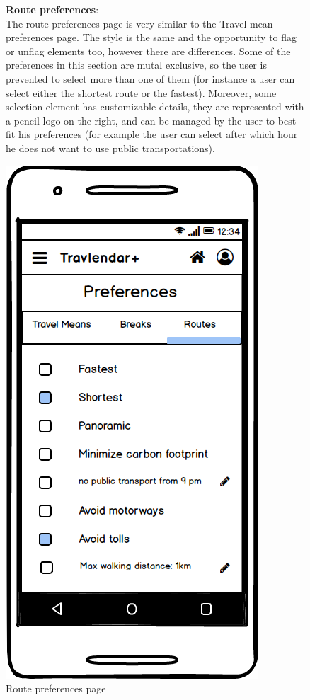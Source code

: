 		\begin{figure}
				\begin{flushleft}
				\textbf{Route preferences}:\\
				The route preferences page is very similar to the Travel mean preferences page. The style is the same and the opportunity to flag or unflag elements too, however there are differences. Some of the preferences in this section are mutal exclusive, so the user is prevented to select more than one of them (for instance a user can select either the shortest route or the fastest). Moreover, some selection element has customizable details, they are represented with a pencil logo on the right, and can be managed by the user to best fit his preferences (for example the user can select after which hour he does not want to use public transportations).
			\end{flushleft}
		\centering
		\includegraphics[width=0.6\linewidth]{mockups/PreferencesRoutes}
		\caption{Route preferences page}
		\label{fig:preferencesroutes}
		
	\end{figure}
	